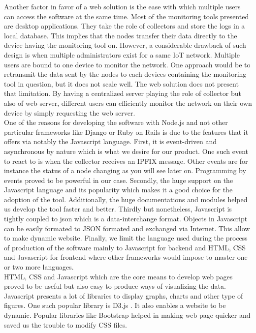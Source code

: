 Another factor in favor of a web solution is the ease with which multiple users can access the software at the same time. Most of the monitoring tools presented are desktop applications. They take the role of collectors and store the logs in a local database. This implies that the nodes transfer their data directly to the device having the monitoring tool on. However, a considerable drawback of such design is when multiple administrators exist for a same IoT network. Multiple users are bound to one device to monitor the network. One approach would be to retransmit the data sent by the nodes to each devices containing the monitoring tool in question, but it does not scale well. The web solution does not present that limitation. By having a centralized server playing the role of collector but also of web server, different users can efficiently monitor the network on their own device by simply requesting the web server. \\

One of the reasons for developing the software with Node.js and not other particular frameworks like Django or Ruby on Rails is due to the features that it offers via notably the Javascript language. First, it is event-driven and asynchronous by nature which is what we desire for our product. One such event to react to is when the collector receives an IPFIX message. Other events are for instance the status of a node changing as you will see later on. Programming by events proved to be powerful in our case. Secondly, the huge support on the Javascript language and its popularity which makes it a good choice for the adoption of the tool. Additionally, the huge documentations and modules helped us develop the tool faster and better. Thirdly but nonetheless, Javascript is tightly coupled to \acrfull{json} \cite{website:json} which is a data-interchange format. Objects in Javascript can be easily formated to JSON formated and exchanged via Internet. This allow to make dynamic website. Finally, we limit the language used during the process of production of the software mainly to Javascript for backend and HTML, CSS and Javascript for frontend where other frameworks would impose to master one or two more languages.\\

HTML, CSS and Javascript which are the core means to develop web pages proved to be useful but also easy to produce ways of visualizing the data. Javascript presents a lot of libraries to display graphs, charts and other type of figures. One such popular library is D3.js \cite{website:d3}. It also enables a website to be dynamic. Popular libraries like Bootstrap\cite{website:bootstrap} helped in making web page quicker and saved us the trouble to modify CSS files.\\

